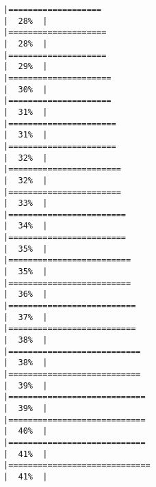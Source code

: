 \documentclass[
]{book}
\begin{document}
\begin{verbatim}
|===================                                                   |  28%  |                                                                              |====================                                                  |  28%  |                                                                              |====================                                                  |  29%  |                                                                              |=====================                                                 |  30%  |                                                                              |=====================                                                 |  31%  |                                                                              |======================                                                |  31%  |                                                                              |======================                                                |  32%  |                                                                              |=======================                                               |  32%  |                                                                              |=======================                                               |  33%  |                                                                              |========================                                              |  34%  |                                                                              |========================                                              |  35%  |                                                                              |=========================                                             |  35%  |                                                                              |=========================                                             |  36%  |                                                                              |==========================                                            |  37%  |                                                                              |==========================                                            |  38%  |                                                                              |===========================                                           |  38%  |                                                                              |===========================                                           |  39%  |                                                                              |============================                                          |  39%  |                                                                              |============================                                          |  40%  |                                                                              |============================                                          |  41%  |                                                                              |=============================                                         |  41%  |                                                                              
\end{verbatim}
\end{document}
